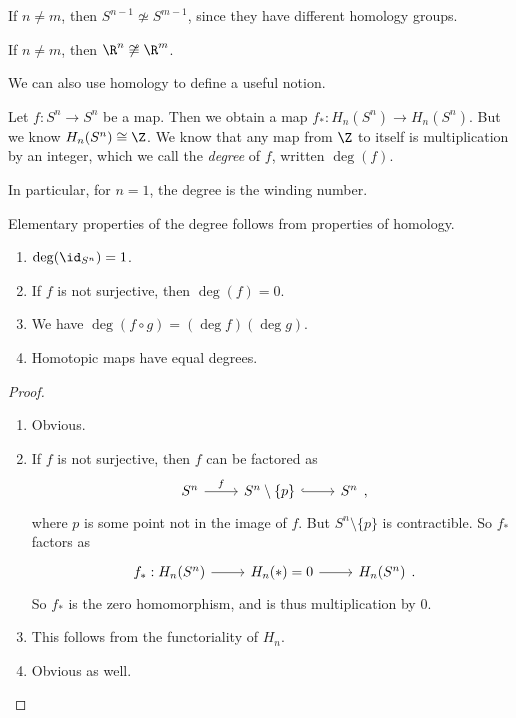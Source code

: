\documentclass[a4paper]{article}
\begin{document}
\begin{cor}
  If $n \not= m$, then $S^{n - 1} \not\simeq S^{m - 1}$, since they have different homology groups.
\end{cor}

\begin{cor}
  If $n \not= m$, then $\R^n \not \cong \R^m$.
\end{cor}

We can also use homology to define a useful notion.
\begin{defi}
  Let $f: S^n \to S^n$ be a map. Then we obtain a map $f_*: H_n(S^n) \to H_n(S^n)$. But we know $H_n(S^n) \cong \Z$. We know that any map from $\Z$ to itself is multiplication by an integer, which we call the \emph{degree} of $f$, written $\deg(f)$.
\end{defi}

In particular, for $n = 1$, the degree is the winding number.

Elementary properties of the degree follows from properties of homology.
\begin{prop}\leavevmode
  \begin{enumerate}
    \item $\deg(\id_{S^n}) = 1$.
    \item If $f$ is not surjective, then $\deg(f) = 0$.
    \item We have $\deg(f\circ g) = (\deg f)(\deg g)$.
    \item Homotopic maps have equal degrees.
  \end{enumerate}
\end{prop}

\begin{proof}\leavevmode
  \begin{enumerate}
    \item Obvious.
    \item If $f$ is not surjective, then $f$ can be factored as
      \[
        \begin{tikzcd}
          S^n \ar[r, "f"] & S^n \setminus \{p\} \ar[r, hook] & S^n
        \end{tikzcd},
      \]
      where $p$ is some point not in the image of $f$. But $S^n \setminus \{p\}$ is contractible. So $f_*$ factors as
      \[
        \begin{tikzcd}
          f_*: H_n(S^n) \ar[r] & H_n(*) = 0 \ar[r] & H_n(S^n)
        \end{tikzcd}.
      \]
      So $f_*$ is the zero homomorphism, and is thus multiplication by $0$.
    \item This follows from the functoriality of $H_n$.
    \item Obvious as well.
  \end{enumerate}
\end{proof}
\end{document}
